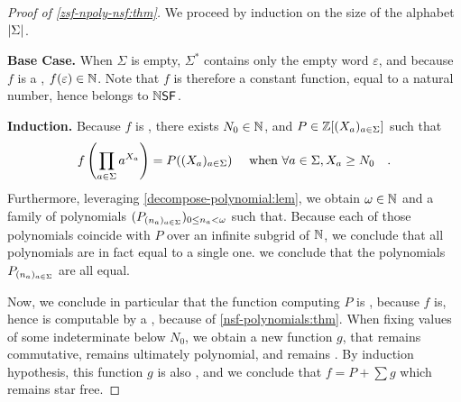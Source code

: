 \begin{proof}[Proof of \cref{zsf-npoly-nsf:thm}]
    We proceed by induction on the size of the alphabet $\card{\Sigma}$.

    \textbf{Base Case.} When $\Sigma$ is empty, $\Sigma^*$ contains
    only the empty word $\varepsilon$, and because $f$ is a
    , $f(\varepsilon) \in \mathbb{N}$.
    Note that $f$ is therefore a constant function, equal to a natural
    number, hence belongs to $\NSF$.

    
    \textbf{Induction.}
    Because $f$ is ,
    there exists $N_0 \in \mathbb{N}$, 
    and $P \in \mathbb{Z}[(X_a)_{a \in \Sigma}]$ 
    such that
    \begin{equation*}
        f\left( \prod_{a \in \Sigma} a^{X_a} \right)
        = 
        P((X_a)_{a \in \Sigma})
        \quad
        \text{ when }
        \forall a \in \Sigma, X_a \geq N_0
        \quad .
    \end{equation*}
    Furthermore, leveraging \cref{decompose-polynomial:lem},
    we obtain $\omega \in \mathbb{N}$
    and a family of polynomials 
    $(P_{(n_a)_{a \in \Sigma}})_{0 \leq n_a < \omega}$
    such that.
    Because each of those polynomials coincide with $P$ over an infinite
    subgrid of $\mathbb{N}$,
    we conclude that all polynomials are in fact equal to a single one.
    we conclude that the polynomials 
    $P_{(n_a)_{a \in \Sigma}}$ are all equal.

    Now, we conclude in particular that the function 
    computing $P$ is , because $f$ is,
    hence is computable by a ,
    because of \cref{nsf-polynomials:thm}.
    When fixing values of some indeterminate below $N_0$,
    we obtain a new function $g$, that remains commutative,
    remains ultimately polynomial, and remains .
    By induction hypothesis, this function $g$ is also 
    , and we conclude
    that 
    $f = P + \sum g$ which remains star free.
\end{proof}

